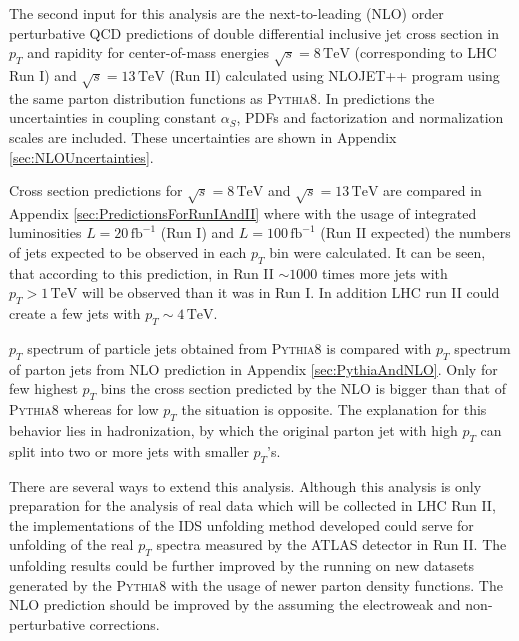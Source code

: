 \documentclass[a4paper,11pt,twoside,openright]{book}
\newcommand{\TeV}{\,\text{TeV}}
\newcommand{\pt}{p_{T}}
\begin{document}
The second input for this analysis are the next-to-leading (NLO) order perturbative QCD
predictions of double differential inclusive jet cross section in $\pt$ and
rapidity for center-of-mass energies $\sqrt{s}=8\TeV$ (corresponding to LHC Run I)
and $\sqrt{s}=13\TeV$ (Run II) calculated using \textsc{NLOJET++} program using
the same parton distribution functions as \textsc{Pythia8}. In predictions the
uncertainties in coupling constant $\alpha_S$, PDFs and
factorization and normalization scales are included. These uncertainties are
shown in Appendix \ref{sec:NLOUncertainties}.

Cross section predictions for $\sqrt{s}=8\TeV$ and $\sqrt{s}=13\TeV$ are
compared in Appendix \ref{sec:PredictionsForRunIAndII} where with the usage of
integrated luminosities $L=20\,\text{fb}^{-1}$ (Run I) and
$L=100\,\text{fb}^{-1}$ (Run II expected) the numbers of jets expected to be
observed in each $\pt$ bin were calculated. It can be seen, that according to
this prediction, in Run II $\sim 1000$ times more jets with $\pt > 1\TeV$ will
be observed than it was in Run I. In addition LHC run II could create a few jets
with $\pt \sim 4 \TeV$.

$\pt$ spectrum of particle jets obtained from \textsc{Pythia8} is compared with
$\pt$ spectrum of parton jets from NLO prediction in Appendix
\ref{sec:PythiaAndNLO}. Only for few highest $\pt$ bins the cross section
predicted by the NLO is bigger than that of \textsc{Pythia8} whereas for low
$\pt$ the situation is opposite. The explanation for this behavior lies in
hadronization, by which the original parton jet with high $\pt$ can split into
two or more jets with smaller $\pt$'s.

There are several ways to extend this analysis. Although this analysis is only
preparation for the analysis of real data which will be collected in LHC Run II,
the implementations of the IDS unfolding method developed could serve for
unfolding of the real $\pt$ spectra measured by the ATLAS detector in Run II.
The unfolding results could be further improved by the running on new datasets
generated by the \textsc{Pythia8} with the usage of newer parton density
functions. The NLO prediction should be improved by the assuming the electroweak
and non-perturbative corrections. 



\end{document}
